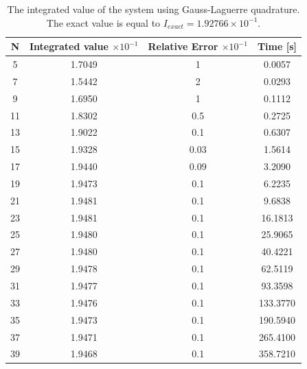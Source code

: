 \documentclass[%
reprint,
amsmath,amssymb,
aps,
]{revtex4-1}
\begin{document}
\begin{table}[!h]
	\begin{tabular}{|c|c|c|c|}
		\hline 
		\hspace{5mm} \textbf{N} \hspace{5mm} & \textbf{Integrated value} $\times 10^{-1}$ & \textbf{Relative Error} $\times 10^{-1}$ & \hspace{3mm}\textbf{Time  [s]} \hspace{5mm}\\
		\hline 
			5 & 1.7049  & 1  & 0.0057 \\
			7 & 1.5442  & 2  & 0.0293 \\
			9 & 1.6950  & 1  & 0.1112 \\
			11 & 1.8302  & 0.5  & 0.2725 \\
			13 & 1.9022  & 0.1  & 0.6307 \\
			15 & 1.9328  & 0.03  & 1.5614 \\
			17 & 1.9440  & 0.09  & 3.2090 \\
			19 & 1.9473  & 0.1  & 6.2235 \\
			21 & 1.9481  & 0.1  & 9.6838 \\
			23 & 1.9481  & 0.1  & 16.1813 \\
			25 & 1.9480  & 0.1  & 25.9065 \\
			27 & 1.9480  & 0.1  & 40.4221 \\
			29 & 1.9478  & 0.1  & 62.5119 \\
			31 & 1.9477  & 0.1  & 93.3598 \\
			33 & 1.9476  & 0.1  & 133.3770 \\
			35 & 1.9473  & 0.1  & 190.5940 \\
			37 & 1.9471  & 0.1  & 265.4100 \\
			39 & 1.9468  & 0.1  & 358.7210 \\

		
		\hline 
	\end{tabular}
	\caption{\label{laguerre_values} \centering The integrated value of the system using Gauss-Laguerre quadrature. The exact value is equal to $I_{exact} = 1.92766 \times 10^{-1}$.}
\end{table}
\end{document}
